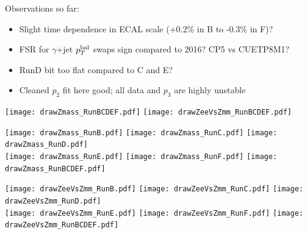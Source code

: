 \documentclass[landscape,10pt]{beamer} %
\begin{document}
Observations so far:
\begin{itemize}
\item Slight time dependence in ECAL scale (+0.2\% in B to -0.3\% in F)?
\item FSR for $\gamma$+jet $p_T^{\rm bal}$ swaps sign compared to 2016? CP5 vs CUETP8M1?
\item RunD bit too flat compared to C and E?
\item Cleaned $p_{2}$ fit here good; all data and $p_{3}$ are highly unstable
\end{itemize}


\newpage

\texttt{[image: drawZmass\_RunBCDEF.pdf]}
\texttt{[image: drawZeeVsZmm\_RunBCDEF.pdf]}

\newpage

\texttt{[image: drawZmass\_RunB.pdf]}
\texttt{[image: drawZmass\_RunC.pdf]}
\texttt{[image: drawZmass\_RunD.pdf]}\\
\texttt{[image: drawZmass\_RunE.pdf]}
\texttt{[image: drawZmass\_RunF.pdf]}
\texttt{[image: drawZmass\_RunBCDEF.pdf]}\\

\newpage

\texttt{[image: drawZeeVsZmm\_RunB.pdf]}
\texttt{[image: drawZeeVsZmm\_RunC.pdf]}
\texttt{[image: drawZeeVsZmm\_RunD.pdf]}\\
\texttt{[image: drawZeeVsZmm\_RunE.pdf]}
\texttt{[image: drawZeeVsZmm\_RunF.pdf]}
\texttt{[image: drawZeeVsZmm\_RunBCDEF.pdf]}\\

\newpage

\end{document}
